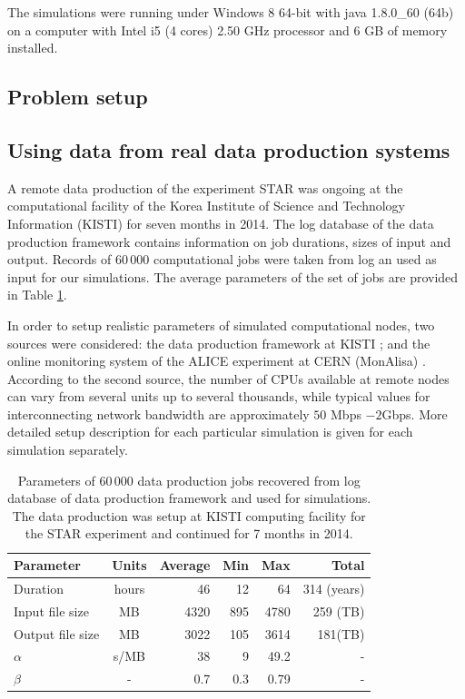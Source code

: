 \documentclass{svjour3}                     %
\begin{document}
The simulations were running under Windows 8 64-bit with java 1.8.0\_60 (64b) on a computer with Intel i5 (4 cores) 2.50 GHz processor and 6 GB of memory installed. 
\subsection{Problem setup}
\subsection{Using data from real data production systems}
A remote data production of the experiment STAR was ongoing at the computational facility of the Korea Institute of Science and Technology Information (KISTI)\cite{KISTI} for seven months in 2014. The log database of the data production framework contains information on job durations, sizes of input and output. Records of 60\,000 computational jobs were taken from log an used as input for our simulations. The average parameters of the set of jobs are provided in Table \ref{tab:jobs}.

In order to setup realistic parameters of simulated computational nodes, two sources were considered: the data production framework at KISTI \cite{KISTI-production}; and the online monitoring system of the ALICE experiment at CERN (MonAlisa) \cite{MonAlisa}. According to the second source, the number of CPUs available at remote nodes can vary from several units up to several thousands, while typical values for interconnecting network bandwidth are approximately $50$ Mbps $- 2 $Gbps. More detailed setup description for each particular simulation is given for each simulation separately. 

\begin{table}
\caption{Parameters of 60\,000 data production jobs recovered from log database of data production framework and used for simulations. The data production was setup at KISTI computing facility for the STAR experiment and continued for 7 months in 2014.}
\label{tab:jobs}
\begin{center}
\begin{tabular}{ l  c  r  r  r	|r }
\hline %
  Parameter  & Units& Average & Min & Max & Total \\ \hline %
  Duration & hours & 46 & 12&64&314 (years) \\ 
  Input file size & MB & 4320& 895&4780&259 (TB) \\	
  Output file size & MB & 3022& 105&3614&181(TB) \\
  $\alpha$ & s/MB & 38& 9&49.2&- \\
  $\beta$ & - & 0.7& 0.3& 0.79&-\\	
  \hline %
\end{tabular}
    \end{center}
\end{table}
\end{document}
